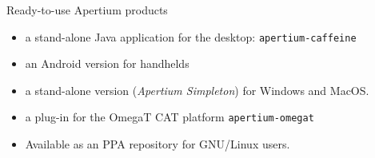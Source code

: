 \documentclass[final]{beamer} %
\newlength{\wideitemsep}
\let\olditem\item
\renewcommand{\item}{\setlength{\itemsep}{\wideitemsep}\olditem}
\begin{document}
\begin{frame}
\begin{columns}
\begin{column}{1\textwidth}
\begin{block}{Ready-to-use Apertium products}
\begin{itemize}
  \item a stand-alone Java application for the desktop: \texttt{apertium-caffeine}
  \item an Android version for handhelds
  \item a stand-alone version (\textit{Apertium Simpleton}) for Windows and MacOS.
  \item a plug-in for the OmegaT CAT platform \texttt{apertium-omegat}
\item Available as an PPA repository for GNU/Linux users.
\end{itemize}
\end{block}

\end{column}
\end{columns}
\end{frame}
\end{document}
